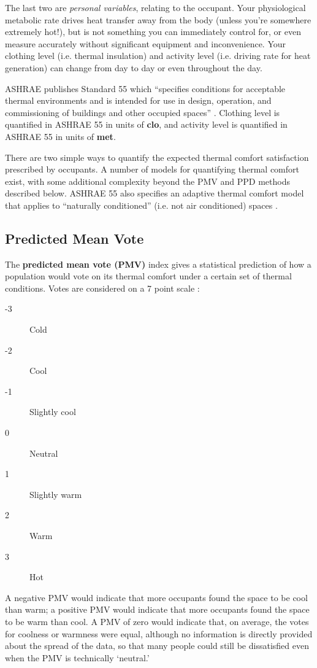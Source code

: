 \documentclass[10pt]{article}
\begin{document}
The last two are \textit{personal variables}, relating to the occupant.
Your physiological metabolic rate drives heat transfer away from the body (unless you're somewhere extremely hot!), but is not something you can immediately control for, or even measure accurately without significant equipment and inconvenience. Your clothing level (i.e. thermal insulation) and activity level (i.e. driving rate for heat generation) can change from day to day or even throughout the day.

ASHRAE publishes Standard 55 which ``specifies conditions for acceptable thermal environments and is intended for use in design, operation, and commissioning of buildings and other occupied spaces'' \cite{noauthor_undated-wv}. Clothing level is quantified in ASHRAE 55 in units of \textbf{clo}, and activity level is quantified in ASHRAE 55 in units of \textbf{met}.

There are two simple ways to quantify the expected thermal comfort satisfaction prescribed by occupants. A number of models for quantifying thermal comfort exist, with some additional complexity beyond the PMV and PPD methods described below. ASHRAE 55 also specifies an adaptive thermal comfort model that applies to ``naturally conditioned'' (i.e. not air conditioned) spaces \cite{noauthor_undated-wv}.

\subsection{Predicted Mean Vote}

The \textbf{predicted mean vote (PMV)} index gives a statistical prediction of how a population would vote on its thermal comfort under a certain set of thermal conditions. Votes are considered on a 7 point scale \cite{noauthor_undated-wv}:

\begin{description}
\item[-3] Cold
\item[-2] Cool
\item[-1] Slightly cool
\item[0] Neutral
\item[1] Slightly warm
\item[2] Warm
\item[3] Hot
\end{description}

A negative PMV would indicate that more occupants found the space to be cool than warm; a positive PMV would indicate that more occupants found the space to be warm than cool. A PMV of zero would indicate that, on average, the votes for coolness or warmness were equal, although no information is directly provided about the spread of the data, so that many people could still be dissatisfied even when the PMV is technically `neutral.'
\end{document}

